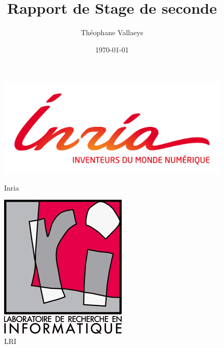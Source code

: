\documentclass{article}
\title{Rapport de Stage de seconde}
\author{Théophane Vallaeys}
\date{\today}
\begin{document}
\begin{titlepage}
		\begin{center}
			\begin{figure}[!tbp]
				\centering
				\begin{minipage}[b]{0.3\linewidth}
					\includegraphics[width=\textwidth]{INRIA_CORPO_RVB.jpg}
					\caption{Inria}
				\end{minipage}
				\hfill
				\begin{minipage}[b]{0.3\linewidth}
					\includegraphics[width=\textwidth]{logo_lri.jpg}
					\caption{LRI}
				\end{minipage}

\end{figure}
\end{center}
\end{titlepage}
\end{document}
